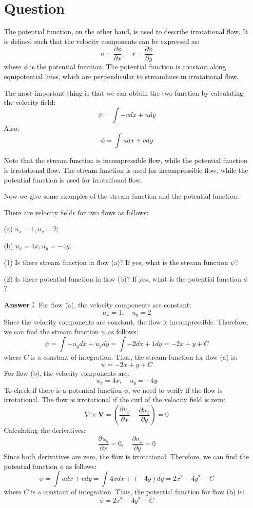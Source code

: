 \documentclass[12pt,a4paper]{article}
\newcounter{question}
\newenvironment{questions}{
    \setcounter{question}{0}
    \section*{Question}
    \begin{enumerate}[leftmargin=1.5em,label={\arabic*．}]
}{
    \end{enumerate}
}
\newcommand{\answer}[1]{\par\noindent\textbf{Answer：} #1\par\vspace{1em}}
\begin{document}
\begin{questions}
{        The potential function, on the other hand, is used to describe irrotational flow. It is defined such that the velocity components can be expressed as:
        \[
        u = \frac{\partial \phi}{\partial x}, \quad v = \frac{\partial \phi}{\partial y}
        \]
        where $\phi$ is the potential function. The potential function is constant along equipotential lines, which are perpendicular to streamlines in irrotational flow.
      
          The most important thing is that we can obtain the two function by calculating the velocity field:
        \[
        \psi = \int - v dx +  u dy
        \]
        Also:
        \[
        \phi = \int u dx + v dy
        \]

        Note that the stream function is incompressible flow, while the potential function is irrotational flow. The stream function is used for incompressible flow, while the potential function is used for irrotational flow.

        Now we give some examples of the stream function and the potential function:

        There are velocity fields for two flows as follows:
      }
(a) \( u_x = 1, u_y = 2 \);

(b) \( u_x = 4x, u_y = -4y \).

(1) Is there stream function in flow (a)? If yes, what is the stream function \( \psi \)?

(2) Is there potential function in flow (b)? If yes, what is the potential function \( \phi \)?

  \answer{
    For flow (a), the velocity components are constant:
    \[
    u_x = 1, \quad u_y = 2
    \]
    Since the velocity components are constant, the flow is incompressible. Therefore, we can find the stream function \( \psi \) as follows:
    \[
    \psi = \int - u_y dx + u_x dy = \int -2 dx + 1 dy = -2x + y + C
    \]
    where \( C \) is a constant of integration. Thus, the stream function for flow (a) is:
    \[
    \psi = -2x + y + C
    \]
    For flow (b), the velocity components are:
    \[
    u_x = 4x, \quad u_y = -4y
    \]
    To check if there is a potential function \( \phi \), we need to verify if the flow is irrotational. The flow is irrotational if the curl of the velocity field is zero:
    \[
    \nabla \times \mathbf{V} = \left( \frac{\partial u_y}{\partial x} - \frac{\partial u_x}{\partial y} \right) = 0
    \]
    Calculating the derivatives:
    \[
    \frac{\partial u_y}{\partial x} = 0, \quad \frac{\partial u_x}{\partial y} = 0
    \]
    Since both derivatives are zero, the flow is irrotational. Therefore, we can find the potential function \( \phi \) as follows:
    \[
    \phi = \int u dx + v dy = \int 4x dx + (-4y) dy = 2x^2 - 4y^2 + C
    \]
    where \( C \) is a constant of integration. Thus, the potential function for flow (b) is:
    \[
    \phi = 2x^2 - 4y^2 + C
    \]
  }


\end{questions}
\end{document}
